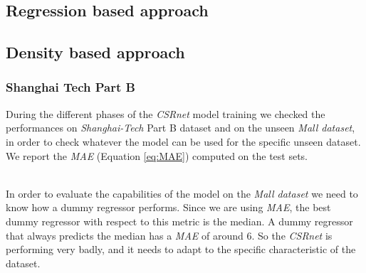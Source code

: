 \documentclass[10pt,twocolumn,letterpaper]{article}
\begin{document}
\subsection{Regression based approach}
\subsection{Density based approach}
\subsubsection{Shanghai Tech Part B}
During the different phases of the \textit{CSRnet} model training we checked the performances on \textit{Shanghai-Tech} Part B dataset and on the unseen \textit{Mall dataset}, in order to check whatever the model can be used for the specific unseen dataset.
We report the \textit{MAE} (Equation \eqref{eq:MAE}) computed on the test sets.
\begin{table}[h!]
	\begin{center}
	\end{center}
	\caption{CSRnet results.}
	\label{CSRnetB}
\end{table}
\\
In order to evaluate the capabilities of the model on the \textit{Mall dataset} we need to know how a dummy regressor performs. Since we are using \textit{MAE}, the best dummy regressor with respect to this metric is the median. A dummy regressor that always predicts the median has a \textit{MAE} of around 6. So the \textit{CSRnet} is performing very badly, and it needs to adapt to the specific characteristic of the dataset.
	
\end{document}
